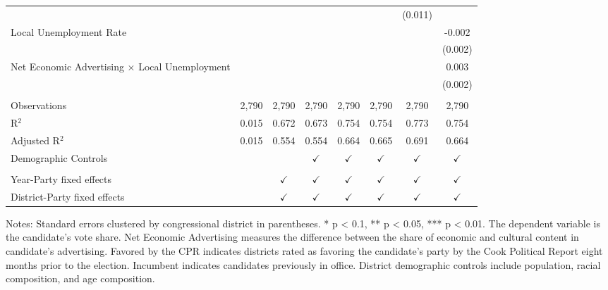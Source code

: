 \begin{table}[htbp]
\begin{tabular}{lccccccc}
                                                    &               &               &               &               &               & (0.011)       &   \\   
      Local Unemployment Rate                       &               &               &               &               &               &               & -0.002\\   
                                                    &               &               &               &               &               &               & (0.002)\\   
      Net Economic Advertising × Local Unemployment &               &               &               &               &               &               & 0.003\\   
                                                    &               &               &               &               &               &               & (0.002)\\   
       \\
      Observations                                  & 2,790         & 2,790         & 2,790         & 2,790         & 2,790         & 2,790         & 2,790\\  
      R$^2$                                         & 0.015         & 0.672         & 0.673         & 0.754         & 0.754         & 0.773         & 0.754\\  
      Adjusted R$^2$                                & 0.015         & 0.554         & 0.554         & 0.664         & 0.665         & 0.691         & 0.664\\  
      Demographic Controls                          &               &               & $\checkmark$  & $\checkmark$  & $\checkmark$  & $\checkmark$  & $\checkmark$\\   
       \\
      Year-Party fixed effects                      &               & $\checkmark$  & $\checkmark$  & $\checkmark$  & $\checkmark$  & $\checkmark$  & $\checkmark$\\   
      District-Party fixed effects                  &               & $\checkmark$  & $\checkmark$  & $\checkmark$  & $\checkmark$  & $\checkmark$  & $\checkmark$\\   
      \bottomrule
   \end{tabular}
   
   \par \raggedright 
   \footnotesize Notes: Standard errors clustered by congressional district in parentheses. * p < 0.1, ** p < 0.05, *** p < 0.01. The dependent variable is the candidate's vote share. Net Economic Advertising measures the difference between the share of economic and cultural content in candidate's advertising. Favored by the CPR indicates districts rated as favoring the candidate's party by the Cook Political Report eight months prior to the election. Incumbent indicates candidates previously in office. District demographic controls include population, racial composition, and age composition.
\end{table}


